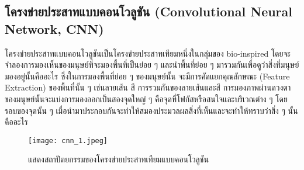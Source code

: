 \subsection{โครงข่ายประสาทแบบคอนโวลูชัน (Convolutional Neural Network, CNN)}
โครงข่ายประสาทแบบคอนโวลูชันเป็นโครงข่ายประสาทเทียมหนึ่งในกลุ่มของ bio-inspired โดยจะจำลองการมองเห็นของมนุษย์ที่จะมองพื้นที่เป็นย่อย ๆ และนำพื้นที่ย่อย ๆ มารวมกันเพื่อดูว่าสิ่งที่มนุษย์มองอยู่นั้นคืออะไร
ซึ่งในการมองพื้นที่ย่อย ๆ ของมนุษย์นั้น จะมีการคัดแยกคุณลักษณะ (Feature Extraction) ของพื้นที่นั้น ๆ เช่นลายเส้น สี การรวมกันของลายเส้นและสี
การมองภาพผ่านดวงตาของมนุษย์นั้นจะแบ่งการมองออกเป็นสองจุดใหญ่ ๆ คือจุดที่โฟกัสหรือสนใจและบริเวณต่าง ๆ โดยรอบของจุดนั้น ๆ  เมื่อนำมาประกอบกันจะทำให้สมองประมวลผลสิ่งที่เห็นและจะทำให้ทราบว่าสิ่ง ๆ นั้นคืออะไร

\begin{figure}[h]
    \centering
    \texttt{[image: cnn\_1.jpeg]}
    \caption{แสดงสถาปัตยกรรมของโครงข่ายประสาทเทียมแบบคอนโวลูชัน}
    \label{Fig:conv_arch_ex1}
\end{figure}

